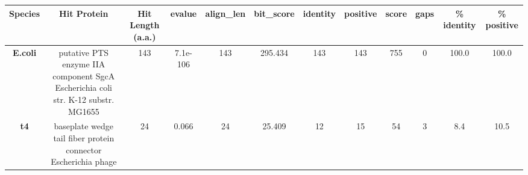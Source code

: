 \begin{tabular}{|c|c|c|c|c|c|c|c|c|c|c|c|} \hline
\textbf{Species} & \textbf{Hit Protein} & \textbf{Hit Length (a.a.)} & \textbf{evalue} & \textbf{align\_len} & \textbf{bit\_score} & \textbf{identity} & \textbf{positive} & \textbf{score} & \textbf{gaps} & \textbf{\% identity} & \textbf{\% positive} \\ \hline
\textbf{E.coli} & putative PTS enzyme IIA component SgcA Escherichia coli str. K-12 substr. MG1655 & 143 & 7.1e-106 & 143 & 295.434 & 143 & 143 & 755 & 0 & 100.0 & 100.0\\
\textbf{t4} & baseplate wedge tail fiber protein connector Escherichia phage  & 24 & 0.066 & 24 & 25.409 & 12 & 15 & 54 & 3 & 8.4 & 10.5\\
\hline \end{tabular}
